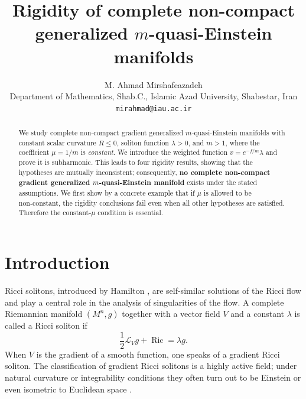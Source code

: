\documentclass[12pt,a4paper]{article}
\title{Rigidity of complete non-compact generalized $m$-quasi-Einstein manifolds}
\author{M. Ahmad Mirshafeazadeh\\ 
Department of Mathematics, Shab.C., Islamic Azad University, Shabestar, Iran\\
\texttt{mirahmad@iau.ac.ir}}
\date{}
\newcommand{\Ric}{\operatorname{Ric}}
\theoremstyle{definition}
\theoremstyle{definition}
\begin{document}
\maketitle

\begin{abstract}
We study complete non-compact gradient generalized $m$-quasi-Einstein manifolds
with constant scalar curvature $R\le 0$, soliton function $\lambda>0$, and $m>1$,
where the coefficient $\mu=1/m$ is \emph{constant}. 
We introduce the weighted function $v=e^{-f/m}\lambda$ and prove it is subharmonic.
This leads to four rigidity results, showing that the hypotheses are mutually inconsistent;
consequently, \textbf{no complete non-compact gradient generalized $m$-quasi-Einstein manifold}
exists under the stated assumptions.
We first show by a concrete example that if $\mu$ is allowed to be non‑constant, 
the rigidity conclusions fail even when all other hypotheses are satisfied.
Therefore the constant‑$\mu$ condition is essential.
\end{abstract}

\section{Introduction}
\label{sec:intro}

Ricci solitons, introduced by Hamilton \cite{Hamilton}, are self-similar solutions of the Ricci flow and play a central role in the analysis of singularities of the flow.
A complete Riemannian manifold $(M^n,g)$ together with a vector field $V$ and a constant $\lambda$ is called a Ricci soliton if
\[
\frac12\mathcal{L}_Vg + \Ric = \lambda g.
\]
When $V$ is the gradient of a smooth function, one speaks of a gradient Ricci soliton.
The classification of gradient Ricci solitons is a highly active field; under natural curvature or integrability conditions they often turn out to be Einstein or even isometric to Euclidean space \cite{Cao,Perelman}.
\end{document}
